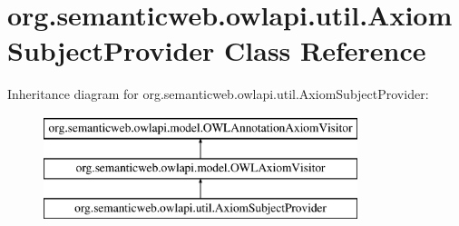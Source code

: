\hypertarget{classorg_1_1semanticweb_1_1owlapi_1_1util_1_1_axiom_subject_provider}{\section{org.\-semanticweb.\-owlapi.\-util.\-Axiom\-Subject\-Provider Class Reference}
\label{classorg_1_1semanticweb_1_1owlapi_1_1util_1_1_axiom_subject_provider}
}
Inheritance diagram for org.\-semanticweb.\-owlapi.\-util.\-Axiom\-Subject\-Provider\-:\begin{figure}[H]
\begin{center}
\leavevmode
\includegraphics[height=3.000000cm]{classorg_1_1semanticweb_1_1owlapi_1_1util_1_1_axiom_subject_provider}
\end{center}
\end{figure}

